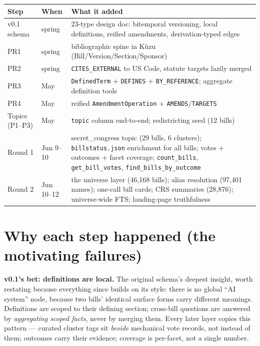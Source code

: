 \documentclass[11pt]{article}
\newcommand{\file}[1]{\texttt{#1}}
\newcommand{\code}[1]{\texttt{#1}}
\begin{document}
\begin{center}
\begin{tabular}{@{}llp{8.6cm}@{}}
\toprule
Step & When & What it added \\
\midrule
v0.1 schema & spring & 23-type design doc: bitemporal versioning, local
definitions, reified amendments, derivation-typed edges \\
PR1 & spring & bibliographic spine in K\`uzu (Bill/Version/Section/Sponsor) \\
PR2 & spring & \code{CITES\_EXTERNAL} to US Code, statute targets lazily merged \\
PR3 & May & \code{DefinedTerm} + \code{DEFINES} + \code{BY\_REFERENCE};
aggregate definition tools \\
PR4 & May & reified \code{AmendmentOperation} + \code{AMENDS}/\code{TARGETS} \\
Topics (P1--P3) & May & \code{topic} column end-to-end; redistricting seed (12 bills) \\
Round 1 & Jun 9--10 & secret\_congress topic (29 bills, 6 clusters);
\file{billstatus.json} enrichment for all bills; votes + outcomes + facet
coverage; \code{count\_bills}, \code{get\_bill\_votes},
\code{find\_bills\_by\_outcome} \\
Round 2 & Jun 10--12 & the universe layer (46{,}168 bills); alias resolution
(97{,}401 names); one-call bill cards; CRS summaries (28{,}876);
universe-wide FTS; landing-page truthfulness \\
\bottomrule
\end{tabular}
\end{center}

\section{Why each step happened (the motivating failures)}
\label{sec:why}

\textbf{v0.1's bet: definitions are local.} The original schema's deepest
insight, worth restating because everything since builds on its style: there
is no global ``AI system'' node, because two bills' identical surface forms
carry different meanings. Definitions are scoped to their defining section;
cross-bill questions are answered by \emph{aggregating scoped facts}, never by
merging them. Every later layer copies this pattern --- curated cluster tags
sit \emph{beside} mechanical vote records, not instead of them; outcomes carry
their evidence; coverage is per-facet, not a single number.
\end{document}
